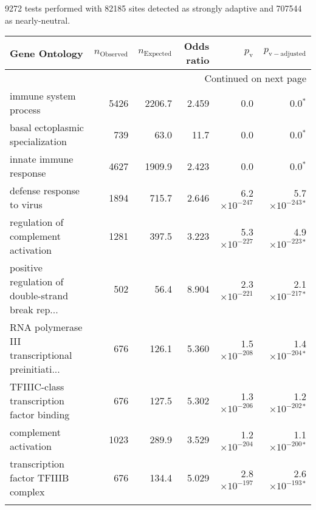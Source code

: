 9272 tests performed with 82185 sites detected as strongly adaptive and 707544 as nearly-neutral.
\scriptsize
\begin{longtable}{|l|r|r|r|r|r|}
\toprule
                                     Gene Ontology & $n_{\mathrm{Observed}}$ & $n_{\mathrm{Expected}}$ & Odds ratio &      $p_{\mathrm{v}}$ &       $p_{\mathrm{v-adjusted}}$ \\
\midrule
\endhead
\midrule
\multicolumn{6}{r}{{Continued on next page}} \\
\midrule
\endfoot

\bottomrule
\endlastfoot
                             immune system process &                    5426 &                  2206.7 &      2.459 &                   0.0 &                    0.0$\bm{^*}$ \\
                  basal ectoplasmic specialization &                     739 &                    63.0 &       11.7 &                   0.0 &                    0.0$\bm{^*}$ \\
                            innate immune response &                    4627 &                  1909.9 &      2.423 &                   0.0 &                    0.0$\bm{^*}$ \\
                         defense response to virus &                    1894 &                   715.7 &      2.646 & 6.2$\times 10^{-247}$ &  5.7$\times 10^{-243}$$\bm{^*}$ \\
               regulation of complement activation &                    1281 &                   397.5 &      3.223 & 5.3$\times 10^{-227}$ &  4.9$\times 10^{-223}$$\bm{^*}$ \\
 positive regulation of double-strand break rep... &                     502 &                    56.4 &      8.904 & 2.3$\times 10^{-221}$ &  2.1$\times 10^{-217}$$\bm{^*}$ \\
 RNA polymerase III transcriptional preinitiati... &                     676 &                   126.1 &      5.360 & 1.5$\times 10^{-208}$ &  1.4$\times 10^{-204}$$\bm{^*}$ \\
         TFIIIC-class transcription factor binding &                     676 &                   127.5 &      5.302 & 1.3$\times 10^{-206}$ &  1.2$\times 10^{-202}$$\bm{^*}$ \\
                             complement activation &                    1023 &                   289.9 &      3.529 & 1.2$\times 10^{-204}$ &  1.1$\times 10^{-200}$$\bm{^*}$ \\
               transcription factor TFIIIB complex &                     676 &                   134.4 &      5.029 & 2.8$\times 10^{-197}$ &  2.6$\times 10^{-193}$$\bm{^*}$ \\
$$
\end{longtable}
